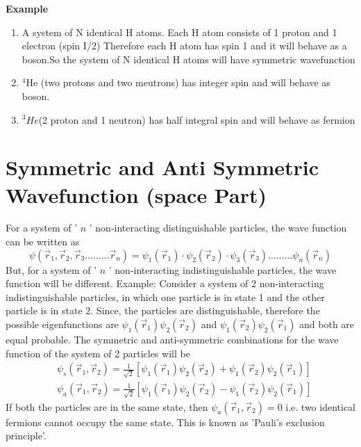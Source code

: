 \textbf{Example} 
\begin{enumerate}[label=\roman*)]
	\item  A system of $\mathrm{N}$ identical $\mathrm{H}$ atoms. Each $\mathrm{H}$ atom consists of 1 proton and 1 electron (spin $\mathrm{I} / 2$) Therefore each H atom has spin 1 and it will behave as a boson.So the system of N identical H atoms will have symmetric wavefunction
	\item  ${ }^{4} \mathrm{He}$ (two protons and two meutrons) has integer spin and will behave as boson.
	\item $^3He$(2 proton and 1 neutron) has half integral spin and will behave as fermion
\end{enumerate}
\section{Symmetric and Anti Symmetric Wavefunction (space Part)}
For a system of ' $n$ ' non-interacting distinguishable particles, the wave function can be written as
$$
\psi\left(\vec{r}_{1}, \vec{r}_{2}, \vec{r}_{3} \ldots \ldots \ldots \vec{r}_{n}\right)=\psi_{1}\left(\vec{r}_{1}\right) \cdot \psi_{2}\left(\vec{r}_{2}\right) \cdot \psi_{3}\left(\vec{r}_{3}\right) \ldots \ldots \ldots \psi_{n}\left(\vec{r}_{n}\right)
$$
But, for a system of ' $n$ ' non-interacting indistinguishable particles, the wave function will be different.
Example:
Consider a system of 2 non-interacting indistinguishable particles, in which one particle is in state 1 and the other particle is in state 2. Since, the particles are distinguishable, therefore the possible eigenfunctions are $\psi_{1}\left(\vec{r}_{1}\right) \psi_{2}\left(\vec{r}_{2}\right)$ and $\psi_{1}\left(\vec{r}_{2}\right) \psi_{2}\left(\vec{r}_{1}\right)$ and both are equal probable. The symmetric and anti-symmetric combinations for the wave function of the system of 2 particles will be
$$
\begin{aligned}
&\psi_{s}\left(\vec{r}_{1}, \vec{r}_{2}\right)=\frac{1}{\sqrt{2}}\left[\psi_{1}\left(\vec{r}_{1}\right) \psi_{2}\left(\vec{r}_{2}\right)+\psi_{1}\left(\vec{r}_{2}\right) \psi_{2}\left(\vec{r}_{1}\right)\right] \\
&\psi_{a}\left(\vec{r}_{1}, \vec{r}_{2}\right)=\frac{1}{\sqrt{2}}\left[\psi_{1}\left(\vec{r}_{1}\right) \psi_{2}\left(\vec{r}_{2}\right)-\psi_{1}\left(\vec{r}_{2}\right) \psi_{2}\left(\vec{r}_{1}\right)\right]
\end{aligned}
$$
If both the particles are in the same state, then $\psi_{a}\left(\vec{r}_{1}, \vec{r}_{2}\right)=0$ i.e. two identical fermions cannot occupy the same state. This is known as 'Pauli's exclusion principle'.\\
